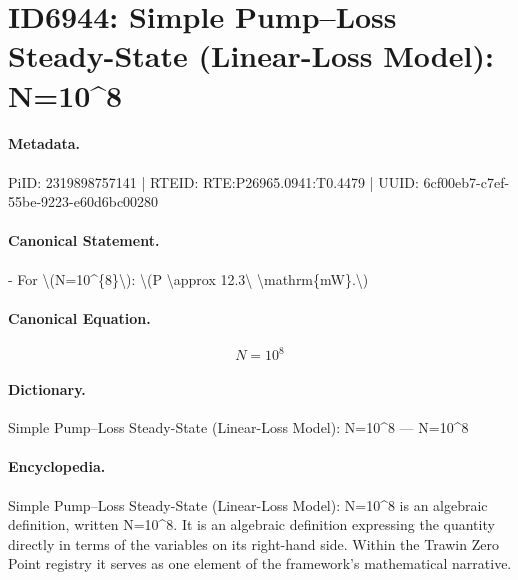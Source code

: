 \section*{ID6944: Simple Pump–Loss Steady-State (Linear-Loss Model): N=10\textasciicircum{}8}
\paragraph{Metadata.}
PiID: 2319898757141 | RTEID: RTE:P26965.0941:T0.4479 | UUID: 6cf00eb7-c7ef-55be-9223-e60d6bc00280

\paragraph{Canonical Statement.}
- For \textbackslash{}(N=10\textasciicircum{}\{8\}\textbackslash{}): \textbackslash{}(P \textbackslash{}approx 12.3\textbackslash{} \textbackslash{}mathrm\{mW\}.\textbackslash{})

\paragraph{Canonical Equation.}
\[
N=10^{8}
\]

\paragraph{Dictionary.}
Simple Pump–Loss Steady-State (Linear-Loss Model): N=10\textasciicircum{}8 — N=10\textasciicircum{}8

\paragraph{Encyclopedia.}
Simple Pump–Loss Steady-State (Linear-Loss Model): N=10\textasciicircum{}8 is an algebraic definition, written N=10\textasciicircum{}8. It is an algebraic definition expressing the quantity directly in terms of the variables on its right-hand side. Within the Trawin Zero Point registry it serves as one element of the framework's mathematical narrative.
